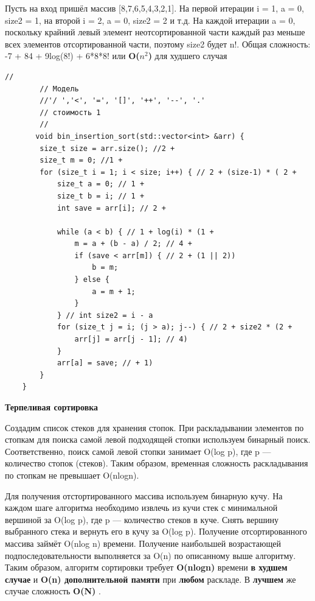 \documentclass[a4paper, 14pt]{article}
\begin{document}
        Пусть на вход пришёл массив [8,7,6,5,4,3,2,1]. На первой итерации i = 1, a = 0, size2 = 1, на второй i = 2, a = 0, size2 = 2 и т.д. На каждой итерации a = 0, поскольку крайний левый элемент неотсортированной части каждый раз меньше всех элементов отсортированной части, поэтому size2 будет n!. Общая сложность: -7 + 84 + 9log(8!) + 6*8*8! или \textbf{O($n^2$)} для худшего случая
    	\begin{lstlisting}[label= bin_ins_code,caption=Сортировка вставками с бинарным поиском]
    	//
        // Модель
        //'/ ','<', '=', '[]', '++', '--', '.'
        // стоимость 1
        //
       void bin_insertion_sort(std::vector<int> &arr) {
        size_t size = arr.size(); //2 +
        size_t m = 0; //1 +
        for (size_t i = 1; i < size; i++) { // 2 + (size-1) * ( 2 +
            size_t a = 0; // 1 +
            size_t b = i; // 1 +
            int save = arr[i]; // 2 +
    
            while (a < b) { // 1 + log(i) * (1 +
                m = a + (b - a) / 2; // 4 +
                if (save < arr[m]) { // 2 + (1 || 2))
                    b = m;
                } else {
                    a = m + 1;
                }
            } // int size2 = i - a
            for (size_t j = i; (j > a); j--) { // 2 + size2 * (2 +
                arr[j] = arr[j - 1]; // 4)
            }
            arr[a] = save; // + 1)
        }
    }
	\end{lstlisting}
	
	 \begin{doublespace}
    \large
    \textbf{Терпеливая сортировка}
    \normalsize
    \end{doublespace}
    
    Создадим список стеков для хранения стопок. При раскладывании элементов по стопкам для поиска самой левой подходящей стопки используем бинарный поиск. Соответственно, поиск самой левой стопки занимает O(log p), где p — количество стопок (стеков). Таким образом, временная сложность раскладывания по стопкам не превышает O(nlogn).

    Для получения отстортированного массива используем бинарную кучу. На каждом шаге алгоритма необходимо извлечь из кучи стек с минимальной вершиной за O(log p), где p — количество стеков в куче. Снять вершину выбранного стека и вернуть его в кучу за O(log p). Получение отсортированного массива займёт O(nlog n) времени. Получение наибольшей возрастающей подпоследовательности выполняется за O(n) по описанному выше алгоритму. Таким образом, алгоритм сортировки требует   \textbf{O(nlogn)} времени \textbf{в худшем случае} и \textbf{O(n) дополнительной памяти} при \textbf{любом} раскладе\cite{parti_state}. В \textbf{лучшем} же случае сложность \textbf{O(N)} \cite{parti_state_best}.
    
\end{document}
